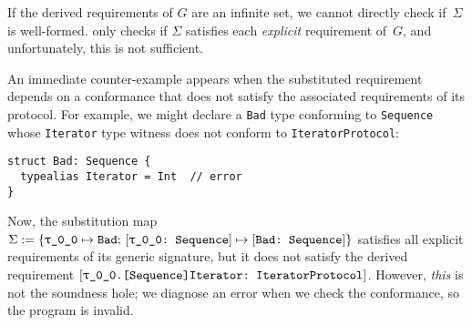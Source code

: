 \documentclass[../generics]{subfiles}
\begin{document}
If the derived requirements of $G$ are an infinite set, we cannot directly check if~$\Sigma$ is well-formed.  only checks if $\Sigma$ satisfies each \emph{explicit} requirement of~$G$, and unfortunately, this is not sufficient.

An immediate counter-example appears when the substituted requirement depends on a conformance that does not satisfy the associated requirements of its protocol. For example, we might declare a \texttt{Bad} type conforming to \texttt{Sequence} whose \texttt{Iterator} type witness does not conform to \texttt{IteratorProtocol}:
\begin{Verbatim}
struct Bad: Sequence {
  typealias Iterator = Int  // error
}
\end{Verbatim}
Now, the substitution map
$\Sigma:=\SubstMapC{\SubstType{\ttgp{0}{0}}{Bad}}{\SubstConf{\ttgp{0}{0}}{Bad}{Sequence}}$ satisfies all explicit requirements of its generic signature, but it does not satisfy the derived requirement $\ConfReq{\ttgp{0}{0}.[Sequence]Iterator}{IteratorProtocol}$. However, \emph{this} is not the soundness hole; we diagnose an error when we check the conformance, so the program is invalid.
\end{document}
